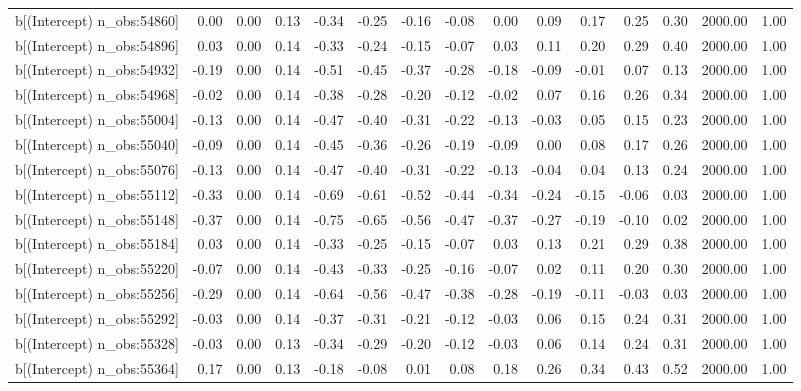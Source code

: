 \begin{table}[ht]
\begin{tabular}{rrrrrrrrrrrrrrr}
  b[(Intercept) n\_obs:54860] & 0.00 & 0.00 & 0.13 & -0.34 & -0.25 & -0.16 & -0.08 & 0.00 & 0.09 & 0.17 & 0.25 & 0.30 & 2000.00 & 1.00 \\ 
  b[(Intercept) n\_obs:54896] & 0.03 & 0.00 & 0.14 & -0.33 & -0.24 & -0.15 & -0.07 & 0.03 & 0.11 & 0.20 & 0.29 & 0.40 & 2000.00 & 1.00 \\ 
  b[(Intercept) n\_obs:54932] & -0.19 & 0.00 & 0.14 & -0.51 & -0.45 & -0.37 & -0.28 & -0.18 & -0.09 & -0.01 & 0.07 & 0.13 & 2000.00 & 1.00 \\ 
  b[(Intercept) n\_obs:54968] & -0.02 & 0.00 & 0.14 & -0.38 & -0.28 & -0.20 & -0.12 & -0.02 & 0.07 & 0.16 & 0.26 & 0.34 & 2000.00 & 1.00 \\ 
  b[(Intercept) n\_obs:55004] & -0.13 & 0.00 & 0.14 & -0.47 & -0.40 & -0.31 & -0.22 & -0.13 & -0.03 & 0.05 & 0.15 & 0.23 & 2000.00 & 1.00 \\ 
  b[(Intercept) n\_obs:55040] & -0.09 & 0.00 & 0.14 & -0.45 & -0.36 & -0.26 & -0.19 & -0.09 & 0.00 & 0.08 & 0.17 & 0.26 & 2000.00 & 1.00 \\ 
  b[(Intercept) n\_obs:55076] & -0.13 & 0.00 & 0.14 & -0.47 & -0.40 & -0.31 & -0.22 & -0.13 & -0.04 & 0.04 & 0.13 & 0.24 & 2000.00 & 1.00 \\ 
  b[(Intercept) n\_obs:55112] & -0.33 & 0.00 & 0.14 & -0.69 & -0.61 & -0.52 & -0.44 & -0.34 & -0.24 & -0.15 & -0.06 & 0.03 & 2000.00 & 1.00 \\ 
  b[(Intercept) n\_obs:55148] & -0.37 & 0.00 & 0.14 & -0.75 & -0.65 & -0.56 & -0.47 & -0.37 & -0.27 & -0.19 & -0.10 & 0.02 & 2000.00 & 1.00 \\ 
  b[(Intercept) n\_obs:55184] & 0.03 & 0.00 & 0.14 & -0.33 & -0.25 & -0.15 & -0.07 & 0.03 & 0.13 & 0.21 & 0.29 & 0.38 & 2000.00 & 1.00 \\ 
  b[(Intercept) n\_obs:55220] & -0.07 & 0.00 & 0.14 & -0.43 & -0.33 & -0.25 & -0.16 & -0.07 & 0.02 & 0.11 & 0.20 & 0.30 & 2000.00 & 1.00 \\ 
  b[(Intercept) n\_obs:55256] & -0.29 & 0.00 & 0.14 & -0.64 & -0.56 & -0.47 & -0.38 & -0.28 & -0.19 & -0.11 & -0.03 & 0.03 & 2000.00 & 1.00 \\ 
  b[(Intercept) n\_obs:55292] & -0.03 & 0.00 & 0.14 & -0.37 & -0.31 & -0.21 & -0.12 & -0.03 & 0.06 & 0.15 & 0.24 & 0.31 & 2000.00 & 1.00 \\ 
  b[(Intercept) n\_obs:55328] & -0.03 & 0.00 & 0.13 & -0.34 & -0.29 & -0.20 & -0.12 & -0.03 & 0.06 & 0.14 & 0.24 & 0.31 & 2000.00 & 1.00 \\ 
  b[(Intercept) n\_obs:55364] & 0.17 & 0.00 & 0.13 & -0.18 & -0.08 & 0.01 & 0.08 & 0.18 & 0.26 & 0.34 & 0.43 & 0.52 & 2000.00 & 1.00 \\ 

\end{tabular}
\end{table}

